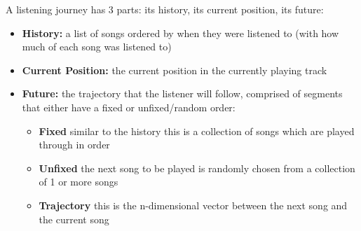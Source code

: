 A listening journey has 3 parts: its history, its current position, its future:\begin{itemize}
    \item \textbf{History:} a list of songs ordered by when they were listened to (with how much of each song was listened to)
    \item \textbf{Current Position:} the current position in the currently playing track
    \item \textbf{Future:} the trajectory that the listener will follow, comprised of segments that either have a fixed or unfixed/random order:\begin{itemize}
        \item \textbf{Fixed} similar to the history this is a collection of songs which are played through in order
        \item \textbf{Unfixed} the next song to be played is randomly chosen from a collection of 1 or more songs
        \item \textbf{Trajectory} this is the n-dimensional vector between the next song and the current song
    \end{itemize}
\end{itemize}

